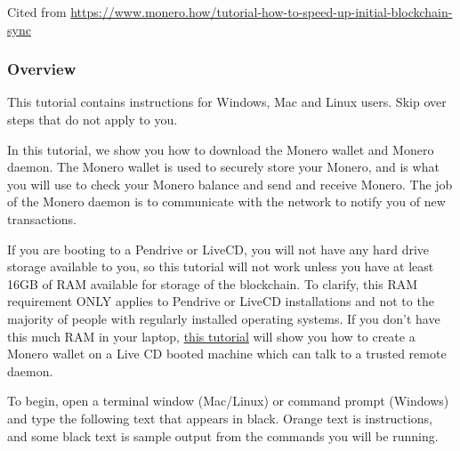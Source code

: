 Cited from \url{https://www.monero.how/tutorial-how-to-speed-up-initial-blockchain-sync}
\subsubsection{Overview}
	\begin{notebox}
	This tutorial contains instructions for Windows, Mac and Linux users. Skip over steps that do not apply to you. 
	\end{notebox}

	In this tutorial, we show you how to download the Monero wallet and Monero daemon. The Monero wallet is used to securely store your Monero, and is what you will use to check your Monero balance and send and receive Monero. The job of the Monero daemon is to communicate with the network to notify you of new transactions. \par
	\begin{warningbox}
		If you are booting to a Pendrive or LiveCD, you will not have any hard drive storage available to you, so this tutorial will not work unless you have at least 16GB of RAM available for storage of the blockchain. To clarify, this RAM requirement ONLY applies to Pendrive or LiveCD installations and not to the majority of people with regularly installed operating systems. If you don't have this much RAM in your laptop, \href{https://www.monero.how/tutorial-how-to-create-a-monero-wallet-linux-boot-usb-pendrive}{this tutorial} will show you how to create a Monero wallet on a Live CD booted machine which can talk to a trusted remote daemon. 
	\end{warningbox}
To begin, open a terminal window (Mac/Linux) or command prompt (Windows) and type the following text that appears in black. Orange text is instructions, and some black text is sample output from the commands you will be running. 

